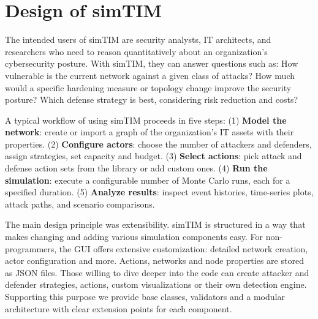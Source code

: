 \documentclass{llncs}
\begin{document}
\section{Design of simTIM}


The intended users of simTIM are security analysts, IT architects, and researchers who need to reason quantitatively about an organization's cybersecurity posture. With simTIM, they can answer questions such as:
How vulnerable is the current network against a given class of attacks?
How much would a specific hardening measure or topology change improve the security posture?
Which defense strategy is best, considering risk reduction and costs?

A typical workflow of using simTIM proceeds in five steps:
(1) \textbf{Model the network}: create or import a graph of the organization's IT assets with their properties.
(2) \textbf{Configure actors}: choose the number of attackers and defenders, assign strategies, set capacity and budget.
(3) \textbf{Select actions}: pick attack and defense action sets from the library or add custom ones.
(4) \textbf{Run the simulation}: execute a configurable number of Monte Carlo runs, each for a specified duration.
(5) \textbf{Analyze results}: inspect event histories, time-series plots, attack paths, and scenario comparisons.

The main design principle was extensibility. simTIM is structured in a way that makes changing and adding various simulation components easy.
For non-programmers, the GUI offers extensive customization: detailed network creation, actor configuration and more. Actions, networks and node properties are stored as JSON files.
Those willing to dive deeper into the code can create attacker and defender strategies, actions, custom visualizations or their own detection engine.
Supporting this purpose we provide base classes, validators and a modular architecture with clear extension points for each component.
\end{document}

